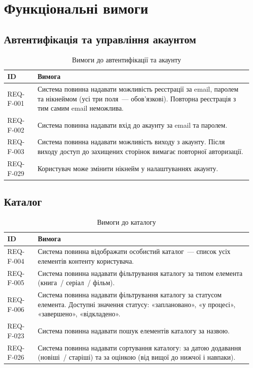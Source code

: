\section{Функціональні вимоги}
\label{sec:funktsionalni-vymohy}

\subsection{Автентифікація та управління акаунтом}

\begin{table}[h]
\caption{Вимоги до автентифікації та акаунту}
\label{tab:auth}
\begin{tabular}{L{2.5cm} L{11.5cm}}
\toprule
\textbf{ID} & \textbf{Вимога} \\
\midrule
REQ-F-001 & Система повинна надавати можливість реєстрації за email, паролем та нікнеймом (усі три поля~--- обов'язкові). Повторна реєстрація з тим самим email неможлива.  \\
\addlinespace
REQ-F-002 & Система повинна надавати вхід до акаунту за email та паролем.  \\
\addlinespace
REQ-F-003 & Система повинна надавати можливість виходу з акаунту. Після виходу доступ до захищених сторінок вимагає повторної авторизації.  \\
\addlinespace
REQ-F-029 & Користувач може змінити нікнейм у налаштуваннях акаунту.  \\
\bottomrule
\end{tabular}
\end{table}

\subsection{Каталог}

\begin{table}[h]
\caption{Вимоги до каталогу}
\label{tab:kataloh}
\begin{tabular}{L{2.5cm} L{11.5cm}}
\toprule
\textbf{ID} & \textbf{Вимога} \\
\midrule
REQ-F-004 & Система повинна відображати особистий каталог~--- список усіх елементів контенту користувача.  \\
\addlinespace
REQ-F-005 & Система повинна надавати фільтрування каталогу за типом елемента (книга~/ серіал~/ фільм).  \\
\addlinespace
REQ-F-006 & Система повинна надавати фільтрування каталогу за статусом елемента. Доступні значення статусу: «заплановано», «у процесі», «завершено», «відкладено».  \\
\addlinespace
REQ-F-023 & Система повинна надавати пошук елементів каталогу за назвою.  \\
\addlinespace
REQ-F-026 & Система повинна надавати сортування каталогу: за датою додавання (новіші~/ старіші) та за оцінкою (від вищої до нижчої і навпаки).  \\
\bottomrule
\end{tabular}
\end{table}

